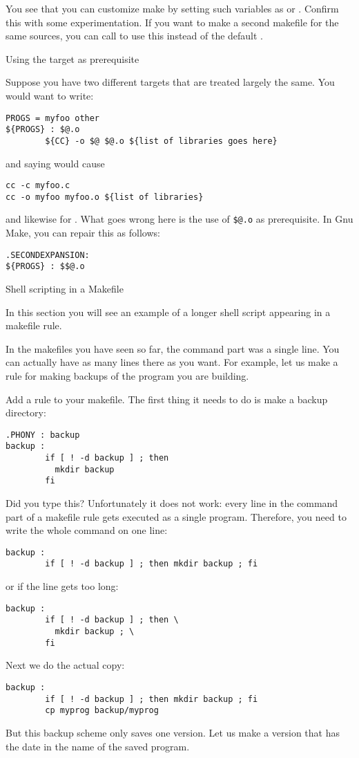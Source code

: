 You see that you can customize make by setting such variables as
 or . Confirm this with some experimentation. If
you want to make a second makefile for the same sources, you can call
 to use this instead of the default
.

 {Using the target as prerequisite}

Suppose you have two different targets that are treated largely the
same. You would want to write:
\begin{verbatim}
PROGS = myfoo other
${PROGS} : $@.o
        ${CC} -o $@ $@.o ${list of libraries goes here}
\end{verbatim}
and saying  would cause 
\begin{verbatim}
cc -c myfoo.c
cc -o myfoo myfoo.o ${list of libraries}
\end{verbatim}
and likewise for . What goes wrong here is the use of
\verb+$@.o+ as prerequisite. In Gnu Make, you can repair this as
follows:
\begin{verbatim}
.SECONDEXPANSION:
${PROGS} : $$@.o
\end{verbatim}

 {Shell scripting in a Makefile}

\begin{purpose}
  In this section you will see an example of a longer shell script
  appearing in a makefile rule.
\end{purpose}

In the makefiles you have seen so far, the command part was a single
line. You can actually have as many lines there as you want.
For example, let us make a rule for making backups of the program you
are building.

Add a   rule to your makefile. The first thing it needs to
do is make a backup directory:
\begin{verbatim}
.PHONY : backup
backup :
        if [ ! -d backup ] ; then 
          mkdir backup
        fi
\end{verbatim}
Did you type this? Unfortunately it does not work: every line in the
command part of a makefile rule gets executed as a single
program. Therefore, you need to write the whole command on one line:
\begin{verbatim}
backup :
        if [ ! -d backup ] ; then mkdir backup ; fi
\end{verbatim}
or if the line gets too long:
\begin{verbatim}
backup :
        if [ ! -d backup ] ; then \
          mkdir backup ; \
        fi
\end{verbatim}
Next we do the actual copy:
\begin{verbatim}
backup :
        if [ ! -d backup ] ; then mkdir backup ; fi
        cp myprog backup/myprog
\end{verbatim}
But this backup scheme only saves one version. Let us make a version
that has the date in the name of the saved program. 

